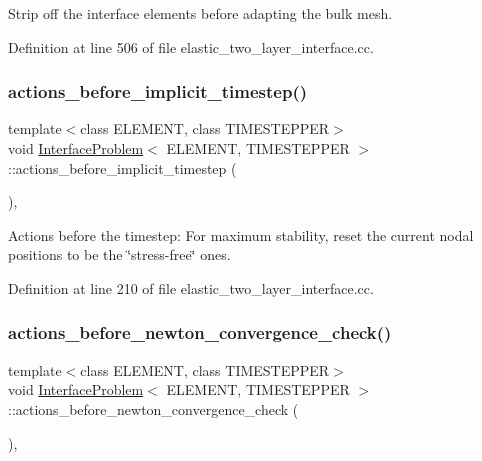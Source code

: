 Strip off the interface elements before adapting the bulk mesh. 



Definition at line 506 of file elastic\+\_\+two\+\_\+layer\+\_\+interface.\+cc.

\mbox{\label{classInterfaceProblem_ae3ec75fcc8ccca97207dc7eca23b1cce}} 
\subsubsection{\texorpdfstring{actions\+\_\+before\+\_\+implicit\+\_\+timestep()}{actions\_before\_implicit\_timestep()}}
{\footnotesize\ttfamily template$<$class E\+L\+E\+M\+E\+NT, class T\+I\+M\+E\+S\+T\+E\+P\+P\+ER$>$ \\
void \hyperlink{classInterfaceProblem}{Interface\+Problem}$<$ E\+L\+E\+M\+E\+NT, T\+I\+M\+E\+S\+T\+E\+P\+P\+ER $>$\+::actions\+\_\+before\+\_\+implicit\+\_\+timestep (\begin{DoxyParamCaption}{ }\end{DoxyParamCaption})\hspace{0.3cm}{\ttfamily [inline]}, {\ttfamily [private]}}



Actions before the timestep\+: For maximum stability, reset the current nodal positions to be the \char`\"{}stress-\/free\char`\"{} ones. 



Definition at line 210 of file elastic\+\_\+two\+\_\+layer\+\_\+interface.\+cc.

\mbox{\label{classInterfaceProblem_ab4193771472aefce4cd67261491cc344}} 
\subsubsection{\texorpdfstring{actions\+\_\+before\+\_\+newton\+\_\+convergence\+\_\+check()}{actions\_before\_newton\_convergence\_check()}}
{\footnotesize\ttfamily template$<$class E\+L\+E\+M\+E\+NT, class T\+I\+M\+E\+S\+T\+E\+P\+P\+ER$>$ \\
void \hyperlink{classInterfaceProblem}{Interface\+Problem}$<$ E\+L\+E\+M\+E\+NT, T\+I\+M\+E\+S\+T\+E\+P\+P\+ER $>$\+::actions\+\_\+before\+\_\+newton\+\_\+convergence\+\_\+check (\begin{DoxyParamCaption}{ }\end{DoxyParamCaption})\hspace{0.3cm}{\ttfamily [inline]}, {\ttfamily [private]}}




